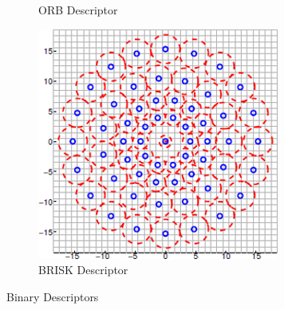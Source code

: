\begin{figure}[htp]
\begin{subfigure}[t]{0.33\textwidth}
    \caption{ORB Descriptor~\cite{Rublee2011}}
  \end{subfigure}
  \begin{subfigure}[t]{0.31\textwidth}
    \centering
    \includegraphics[width=\linewidth]{images/feature/brisk.png}
    \caption{BRISK Descriptor~\cite{Leutenegger2011}}
  \end{subfigure}
  \caption{Binary Descriptors}
  \label{fig:binary_descriptors}
\end{figure}

